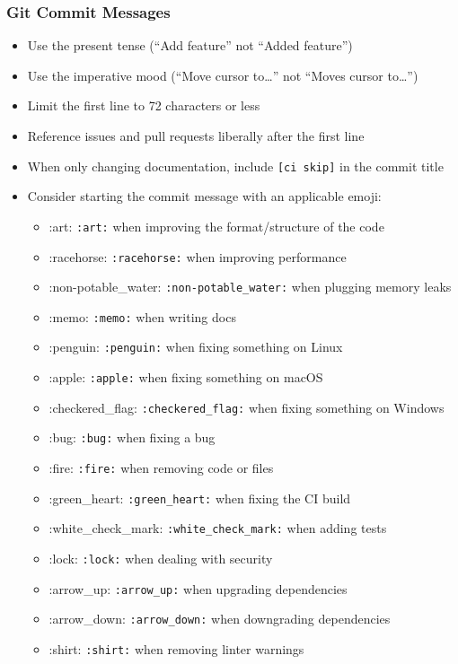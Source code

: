 \hypertarget{git-commit-messages}{%
\subsubsection{Git Commit Messages}\label{git-commit-messages}}

\begin{itemize}
\tightlist
\item
  Use the present tense (``Add feature'' not ``Added feature'')
\item
  Use the imperative mood (``Move cursor to\ldots{}'' not ``Moves cursor
  to\ldots{}'')
\item
  Limit the first line to 72 characters or less
\item
  Reference issues and pull requests liberally after the first line
\item
  When only changing documentation, include \texttt{{[}ci\ skip{]}} in
  the commit title
\item
  Consider starting the commit message with an applicable emoji:

  \begin{itemize}
  \tightlist
  \item
    :art: \texttt{:art:} when improving the format/structure of the code
  \item
    :racehorse: \texttt{:racehorse:} when improving performance
  \item
    :non-potable\_water: \texttt{:non-potable\_water:} when plugging
    memory leaks
  \item
    :memo: \texttt{:memo:} when writing docs
  \item
    :penguin: \texttt{:penguin:} when fixing something on Linux
  \item
    :apple: \texttt{:apple:} when fixing something on macOS
  \item
    :checkered\_flag: \texttt{:checkered\_flag:} when fixing something
    on Windows
  \item
    :bug: \texttt{:bug:} when fixing a bug
  \item
    :fire: \texttt{:fire:} when removing code or files
  \item
    :green\_heart: \texttt{:green\_heart:} when fixing the CI build
  \item
    :white\_check\_mark: \texttt{:white\_check\_mark:} when adding tests
  \item
    :lock: \texttt{:lock:} when dealing with security
  \item
    :arrow\_up: \texttt{:arrow\_up:} when upgrading dependencies
  \item
    :arrow\_down: \texttt{:arrow\_down:} when downgrading dependencies
  \item
    :shirt: \texttt{:shirt:} when removing linter warnings
  \end{itemize}
\end{itemize}


